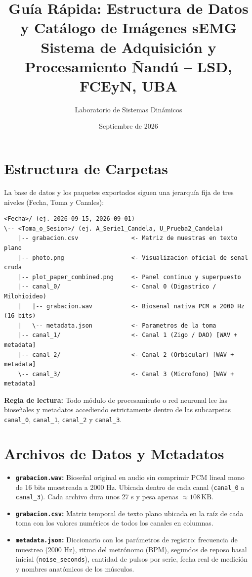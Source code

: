 \documentclass[11pt,a4paper]{article}
\title{\textbf{Guía Rápida: Estructura de Datos y Catálogo de Imágenes sEMG}\\[0.2em]
\large Sistema de Adquisición y Procesamiento Ñandú -- LSD, FCEyN, UBA}
\author{Laboratorio de Sistemas Dinámicos}
\date{Septiembre de 2026}
\begin{document}
\maketitle

\section{Estructura de Carpetas}

La base de datos y los paquetes exportados siguen una jerarquía fija de tres niveles (Fecha, Toma y Canales):

\begin{verbatim}
<Fecha>/ (ej. 2026-09-15, 2026-09-01)
\-- <Toma_o_Sesion>/ (ej. A_Serie1_Candela, U_Prueba2_Candela)
    |-- grabacion.csv               <- Matriz de muestras en texto plano
    |-- photo.png                   <- Visualizacion oficial de senal cruda
    |-- plot_paper_combined.png     <- Panel continuo y superpuesto
    |-- canal_0/                    <- Canal 0 (Digastrico / Milohioideo)
    |   |-- grabacion.wav           <- Biosenal nativa PCM a 2000 Hz (16 bits)
    |   \-- metadata.json           <- Parametros de la toma
    |-- canal_1/                    <- Canal 1 (Zigo / DAO) [WAV + metadata]
    |-- canal_2/                    <- Canal 2 (Orbicular) [WAV + metadata]
    \-- canal_3/                    <- Canal 3 (Microfono) [WAV + metadata]
\end{verbatim}

\textbf{Regla de lectura:} Todo módulo de procesamiento o red neuronal lee las bioseñales y metadatos accediendo estrictamente dentro de las subcarpetas \texttt{canal\_0}, \texttt{canal\_1}, \texttt{canal\_2} y \texttt{canal\_3}.

\section{Archivos de Datos y Metadatos}

\begin{itemize}[leftmargin=*, itemsep=4pt]
    \item \textbf{\texttt{grabacion.wav}:} Bioseñal original en audio sin comprimir PCM lineal mono de 16 bits muestreada a 2000 Hz. Ubicada dentro de cada canal (\texttt{canal\_0} a \texttt{canal\_3}). Cada archivo dura unos 27 s y pesa apenas $\approx 108\,\text{KB}$.
    \item \textbf{\texttt{grabacion.csv}:} Matriz temporal de texto plano ubicada en la raíz de cada toma con los valores numéricos de todos los canales en columnas.
    \item \textbf{\texttt{metadata.json}:} Diccionario con los parámetros de registro: frecuencia de muestreo (2000 Hz), ritmo del metrónomo (BPM), segundos de reposo basal inicial (\texttt{noise\_seconds}), cantidad de pulsos por serie, fecha real de medición y nombres anatómicos de los músculos.
\end{itemize}
\end{document}
